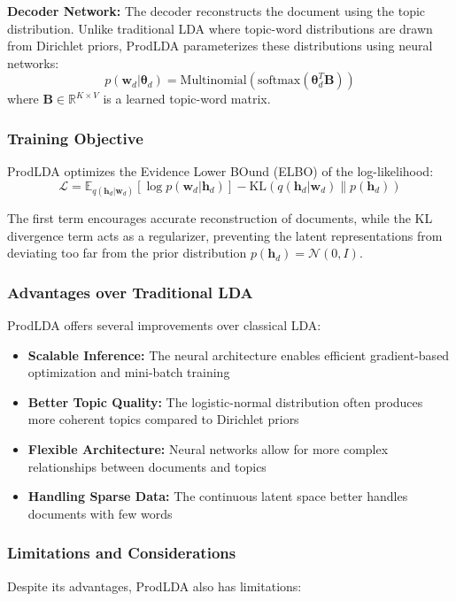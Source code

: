 \documentclass[12pt]{article}
\begin{document}
\textbf{Decoder Network:} The decoder reconstructs the document using the topic distribution. Unlike traditional LDA where topic-word distributions are drawn from Dirichlet priors, ProdLDA parameterizes these distributions using neural networks:
\begin{equation}
    p(\mathbf{w}_d | \boldsymbol{\theta}_d) = \text{Multinomial}(\text{softmax}(\boldsymbol{\theta}_d^T \mathbf{B}))
\end{equation}
where $\mathbf{B} \in \mathbb{R}^{K \times V}$ is a learned topic-word matrix.

\subsubsection{Training Objective}
ProdLDA optimizes the Evidence Lower BOund (ELBO) of the log-likelihood:
\begin{equation}
    \mathcal{L} = \mathbb{E}_{q(\mathbf{h}_d|\mathbf{w}_d)}[\log p(\mathbf{w}_d|\mathbf{h}_d)] - \text{KL}(q(\mathbf{h}_d|\mathbf{w}_d) \| p(\mathbf{h}_d))
\end{equation}

The first term encourages accurate reconstruction of documents, while the KL
divergence term acts as a regularizer, preventing the latent representations
from deviating too far from the prior distribution $p(\mathbf{h}_d) =
    \mathcal{N}(0, I)$.

\subsubsection{Advantages over Traditional LDA}
ProdLDA offers several improvements over classical LDA:

\begin{itemize}
    \item \textbf{Scalable Inference:} The neural architecture enables efficient gradient-based optimization and mini-batch training
    \item \textbf{Better Topic Quality:} The logistic-normal distribution often produces more coherent topics compared to Dirichlet priors
    \item \textbf{Flexible Architecture:} Neural networks allow for more complex relationships between documents and topics
    \item \textbf{Handling Sparse Data:} The continuous latent space better handles documents with few words
\end{itemize}

\subsubsection{Limitations and Considerations}
Despite its advantages, ProdLDA also has limitations:
\end{document}
